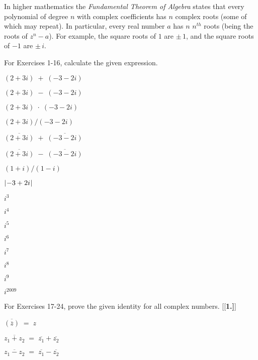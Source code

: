 In higher mathematics the \emph{Fundamental Theorem of Algebra} states that every polynomial of
degree $n$ with complex coefficients has $n$ complex roots (some of which may repeat). In
particular, every real number $a$ has $n$ $n^{th}$ roots (being the roots of $z^n - a$).
For example, the square roots of $1$ are $\pm\,1$, and the square
roots of $-1$ are $\pm\,i$.

\divider
\vspace{3mm}

\startexercises\label{sec6dot3}
\vspace{5mm}
{\small
\noindent For Exercises 1-16, calculate the given expression.
\begin{enumerate}[\bfseries 1.]
\begin{multicols}{4}
 \item $(2+3i) \;+\; (-3-2i)$
 \item $(2+3i) \;-\; (-3-2i)$
 \item $(2+3i) \;\cdot\; (-3-2i)$
 \item $(2+3i)/(-3-2i)$
\end{multicols}
\begin{multicols}{4}
 \item $\overline{(2+3i)} \;+\; \overline{(-3-2i)}$
 \item $\overline{(2+3i)} \;-\; \overline{(-3-2i)}$
 \item $(1+i)/(1-i)$
 \item $\lvert\mspace{1mu}-3+2i\mspace{1mu}\rvert$
\end{multicols}
\begin{multicols}{8}
 \item $i^3$
 \item $i^4$
 \item $i^5$
 \item $i^6$
 \item $i^7$
 \item $i^8$
 \item $i^9$
 \item $i^{2009}$
\end{multicols}
For Exercises 17-24, prove the given identity for all complex numbers.
[{[\bfseries 1.]}]
\begin{multicols}{4}
 \item $\overline{\left( \overline{z} \right)} \;=\; z$
 \item $\overline{z_1 + z_2} \;=\; \overline{z_1} + \overline{z_2}$
 \item $\overline{z_1 - z_2} \;=\; \overline{z_1} - \overline{z_2}$

\end{multicols}
\end{enumerate}}
